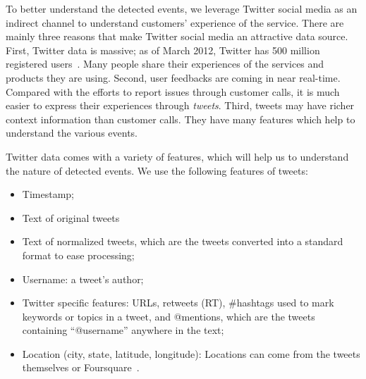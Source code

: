 To better understand the detected events, we leverage Twitter social media
as an indirect channel to understand customers' experience of the service.
There are mainly three reasons that make Twitter social media an attractive data source.
First, Twitter data is massive; as of March 2012, Twitter has 500 million registered users~\cite{massive-twitter}.
Many people share their experiences of the services and products they are using.
Second, user feedbacks are coming in near real-time. Compared with the efforts to report 
issues through customer calls, it is much easier to express their experiences through \emph{tweets}. 
Third, tweets may have richer context information than customer calls. They have many features which help to
understand the various events.


Twitter data comes with a variety of features, which will help us to 
understand the nature of detected events. 
We use the following features of tweets:
\begin{itemize}
\item Timestamp; 
\item Text of original tweets
\item Text of normalized tweets, which are the tweets converted into a standard format to ease processing; 
\item Username: a tweet's author;
\item Twitter specific features: URLs, retweets (RT), \#hashtags used to mark keywords or
  topics in a tweet, and @mentions, which are the tweets containing ``@username'' anywhere in the text;
\item Location (city, state, latitude, longitude): Locations can come from the 
tweets themselves or Foursquare~\cite{foursquare/API}. %
\end{itemize}


